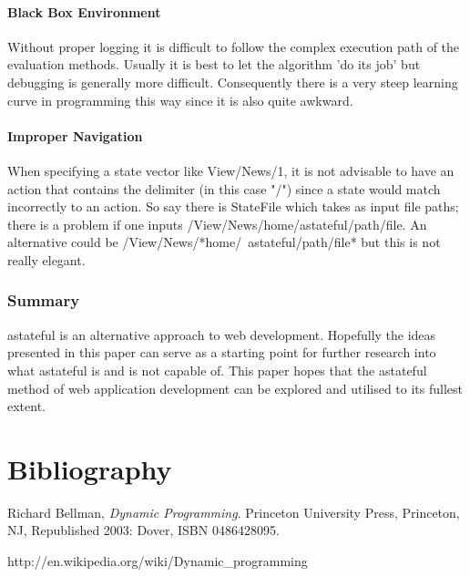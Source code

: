\documentclass[11pt,twocolumn]{article}
\begin{document}
\subsection{Black Box Environment}
Without proper logging it is difficult to follow the complex execution path of the evaluation methods. Usually it is best to let the algorithm 'do its job' but debugging is generally more difficult. Consequently there is a very steep learning curve in programming this way since it is also quite awkward.
\subsection{Improper Navigation}
When specifying a state vector like View/News/1, it is not advisable to have an action that contains the delimiter (in this case "/") since a state would match incorrectly to an action. So say there is StateFile which takes as input file paths; there is a problem if one inputs /View/News/home/astateful/path/file. An alternative could be /View/News/*home/~astateful/path/file* but this is not really elegant.
\section{Summary}
astateful is an alternative approach to web development. Hopefully the ideas presented in this paper can serve as a starting point for further research into what astateful is and is not capable of. This paper hopes that the astateful method of web application development can be explored and utilised to its fullest extent.

\newpage
\part{Bibliography}
\begin{thebibliography}{9}

	  Richard Bellman,
	  \emph{Dynamic Programming}.
	   Princeton University Press, Princeton, NJ,
	   Republished 2003: Dover, ISBN 0486428095.

http://en.wikipedia.org/wiki/Dynamic\_programming

\end{thebibliography}
\end{document}
